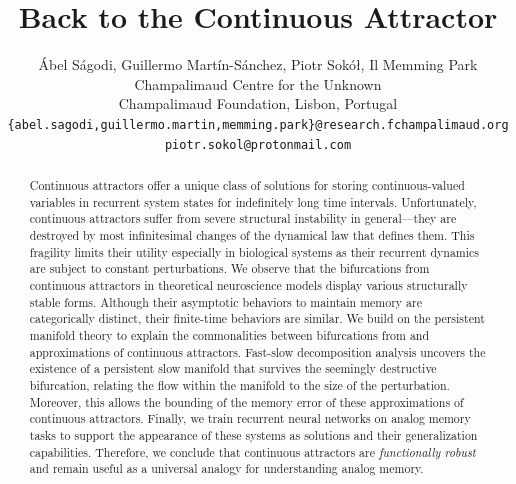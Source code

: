 \documentclass{article} %
\title{Back to the Continuous Attractor}
\author{
    \'Abel S\'agodi, Guillermo Mart\'in-S\'anchez, Piotr Sok\'o\l, Il Memming Park
    \vspace{1ex}\\
    Champalimaud Centre for the Unknown\\
    Champalimaud Foundation, Lisbon, Portugal\\
    \texttt{\{abel.sagodi,guillermo.martin,memming.park\}@research.fchampalimaud.org}\\
    \texttt{piotr.sokol@protonmail.com}
}
\newcounter{ct}
\theoremstyle{definition}
\theoremstyle{remark}
\begin{document}
\maketitle
\begin{abstract}
Continuous attractors offer a unique class of solutions for storing continuous-valued variables in recurrent system states for indefinitely long time intervals.
Unfortunately, continuous attractors suffer from severe structural instability in general---they are destroyed by most infinitesimal changes of the dynamical law that defines them.
This fragility limits their utility especially in biological systems as their recurrent dynamics are subject to constant perturbations.
We observe that the bifurcations from continuous attractors in theoretical neuroscience models display various structurally stable forms.
Although their asymptotic behaviors to maintain memory are categorically distinct, their finite-time behaviors are similar.
We build on the persistent manifold theory to explain the commonalities between bifurcations from and approximations of continuous attractors.
Fast-slow decomposition analysis uncovers the existence of a persistent slow manifold that survives the seemingly destructive bifurcation, relating the flow within the manifold to the size of the perturbation. Moreover, this allows the bounding of the memory error of these approximations of continuous attractors.
Finally, we train recurrent neural networks on analog memory tasks to support the appearance of these systems as solutions and their generalization capabilities.
Therefore, we conclude that continuous attractors are \emph{functionally robust} and remain useful as a universal analogy for understanding analog memory.
\end{abstract}
\end{document}
